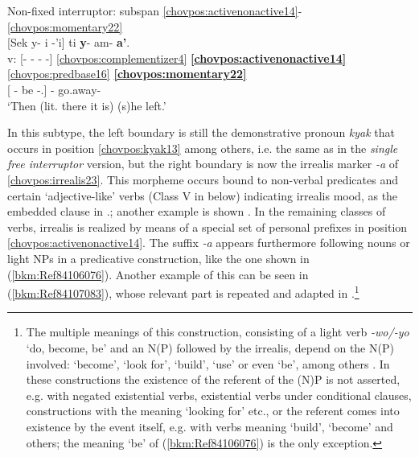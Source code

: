 \documentclass[output=paper]{langscibook}
\begin{document}
\ea\label{bkm:Ref90047260}Non-fixed interruptor: subspan \ref{chovpos:activenonactive14}{}-\ref{chovpos:momentary22} \\
\glll {} [Sek y- i -'i] ti \textbf{y}{}- am- \textbf{a'}.\\
v: [- - - -] \ref{chovpos:complementizer4} \textbf{\ref{chovpos:activenonactive14}} \ref{chovpos:predbase16} \textbf{\ref{chovpos:momentary22}} \\
{} [\Dem{} \Third{}- be -\Ap.\Punct{}] \Comp{} \textbf{\Third{}}- go.away- \textbf{\Mom{}} \\ 
\glt`Then (lit. there it is) (s)he left.'
\z 

In this subtype, the left boundary is still the demonstrative pronoun \textit{kyak} that occurs in position \ref{chovpos:kyak13} among others, i.e. the same as in the \textit{single free interruptor} version, but the right boundary is now the irrealis marker \textit{-a} of \ref{chovpos:irrealis23}. This morpheme occurs bound to non-verbal predicates and certain `adjective-like' verbs (Class V in  below) indicating irrealis mood, as the embedded clause in .; another example is shown . In the remaining classes of verbs, irrealis is realized by means of a special set of personal prefixes in position \ref{chovpos:activenonactive14}. The suffix \textit{-a} appears furthermore following nouns or light NPs in a predicative construction, like the one shown in (\ref{bkm:Ref84106076}). Another example of this can be seen in (\ref{bkm:Ref84107083}), whose relevant part is repeated and adapted in .\footnote{The multiple meanings of this construction, consisting of a light verb \textit{-wo/-yo} `do, become, be' and an N(P) followed by the irrealis, depend on the N(P) involved: `become', `look for', `build', `use' or even `be', among others \citep[909--910]{Carol2015}. In these constructions the existence of the referent of the (N)P is not asserted, e.g. with negated existential verbs, existential verbs under conditional clauses, constructions with the meaning `looking for' etc., or the referent comes into existence by the event itself, e.g. with verbs meaning `build', `become' and others; the meaning `be' of (\ref{bkm:Ref84106076}) is the only exception.}
\end{document}
